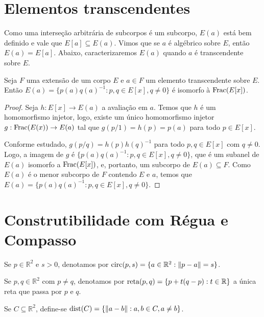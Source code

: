 \section{Elementos transcendentes}
Como uma interseção arbitrária de subcorpos é um subcorpo, $E(a)$ está bem definido e vale que $E[a]\subseteq E(a)$. Vimos que se $a$ é algébrico sobre $E$, então $E(a)=E[a]$. Abaixo, caracterizaremos $E(a)$ quando $a$ é transcendente sobre $E$.
\begin{prop}
        Seja $F$ uma extensão de um corpo $E$ e $a \in F$ um elemento transcendente sobre $E$. Então $E(a)=\{p(a)q(a)^{-1}: p, q \in E[x], q\neq 0\}$ é isomorfo à $\operatorname{Frac}(E[x])$.
\end{prop}
\begin{proof}
    Seja $h:E[x] \rightarrow E(a)$ a avaliação em $a$. Temos que $h$ é um homomorfismo injetor, logo, existe um único homomorfismo injetor $g:\operatorname{Frac}(E(x))\rightarrow E(a)$ tal que $g(p/1)=h(p)=p(a)$ para todo $p \in E[x]$.

    Conforme estudado, $g(p/q)=h(p)h(q)^{-1}$ para todo $p, q \in E[x]$ com $q\neq 0$.
    Logo, a imagem de $g$ é $\{p(a)q(a)^{-1}: p, q \in E[x], q\neq 0\}$, que é um subanel de $E(a)$ isomorfo a $\operatorname{Frac}(E[x])$, e, portanto, um subcorpo de $E(a)\subseteq F$. Como $E(a)$ é o menor subcorpo de $F$ contendo $E$ e $a$, temos que $E(a)=\{p(a)q(a)^{-1}: p, q \in E[x], q\neq 0\}$.
\end{proof}
 
\section{Construtibilidade com Régua e Compasso}


\begin{definition}
    Se $p \in \mathbb R^2$ e $s>0$, denotamos por $\operatorname{circ}(p, s)=\{a \in \mathbb R^2: \|p-a\|=s\}$.

    Se $p, q \in \mathbb R^2$ com $p\neq q$, denotamos por $\operatorname{reta}(p, q)=\{p+t(q-p): t \in \mathbb R\}$ a única reta que passa por $p$ e $q$.

    Se $C\subseteq \mathbb R^2$, define-se $\operatorname{dist}(C)=\{\|a-b\|: a, b \in C, a\neq b\}$.
\end{definition}

